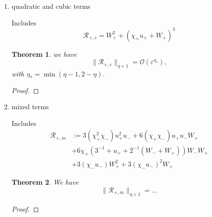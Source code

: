 \documentclass[letterpaper,11pt]{article}
\newcommand{\rmO}{\mathcal{O}}
\newcommand{\eps}{\varepsilon}
\numberwithin{equation}{section}
\theoremstyle{plain}
\newtheorem{theorem}{Theorem}[section]
\begin{document}
\begin{itemize}
\begin{enumerate}
\begin{proof}[proof of theorem]
\end{proof}
\item quadratic and cubic terms

Includes
\[
\mathcal{R}_{+,c} = W_+^2 + (\chi_+u_+ + W_+)^3
\]

\begin{theorem}
we have
\[
\| \mathcal{R}_{+,c} \|_{\eta+1} = \rmO(\eps^{\eta_*}),
\]
with $\eta_* = \min(\eta-1, 2-\eta)$.
\end{theorem}

\begin{proof}

\end{proof}
\item mixed terms

Includes
\begin{align*}
\mathcal{R}_{+,m} &:=3(\chi_+^2\chi_-)u_+^2u_- + 6(\chi_+\chi_-)u_+ u_- W_+\\
&+6\chi_+(3^{-1} + u_+ + 2^{-1}(W_-+W_+))W_-W_+\\
&+ 3(\chi_-u_-)W_+^2 + 3(\chi_-u_-)^2W_+
\end{align*}

 \begin{theorem}
 We have
 \[
 \|\mathcal{R}_{+,m}\|_{\eta+1} = ...
 \]
 \end{theorem}
 
 \begin{proof}

 \end{proof}
\end{enumerate}

\end{itemize}



\end{document}
